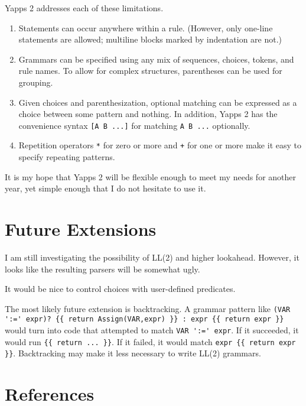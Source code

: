 \documentclass[10pt]{article}
\newcommand{\mysection}[1]{\section{#1}}
\begin{document}
Yapps 2 addresses each of these limitations.

\begin{enumerate}
 \item Statements can occur anywhere within a rule.  (However, only
   one-line statements are allowed; multiline blocks marked by
   indentation are not.)
 \item Grammars can be specified using any mix of sequences, choices,
   tokens, and rule names.  To allow for complex structures,
   parentheses can be used for grouping.
 \item Given choices and parenthesization, optional matching can be
   expressed as a choice between some pattern and nothing.  In
   addition, Yapps 2 has the convenience syntax \verb|[A B ...]| for
   matching \verb|A B ...| optionally.
 \item Repetition operators \verb|*| for zero or more and \verb|+| for 
   one or more make it easy to specify repeating patterns.
\end{enumerate}

It is my hope that Yapps 2 will be flexible enough to meet my needs
for another year, yet simple enough that I do not hesitate to use it.

\mysection{Future Extensions}
\label{sec:future}

I am still investigating the possibility of LL(2) and higher
lookahead.  However, it looks like the resulting parsers will be
somewhat ugly.  

It would be nice to control choices with user-defined predicates.

The most likely future extension is backtracking.  A grammar pattern
like \verb|(VAR ':=' expr)? {{ return Assign(VAR,expr) }} : expr {{ return expr }}|
would turn into code that attempted to match \verb|VAR ':=' expr|.  If 
it succeeded, it would run \verb|{{ return ... }}|.  If it failed, it
would match \verb|expr {{ return expr }}|.  Backtracking may make it
less necessary to write LL(2) grammars.

\mysection{References}
\end{document}
